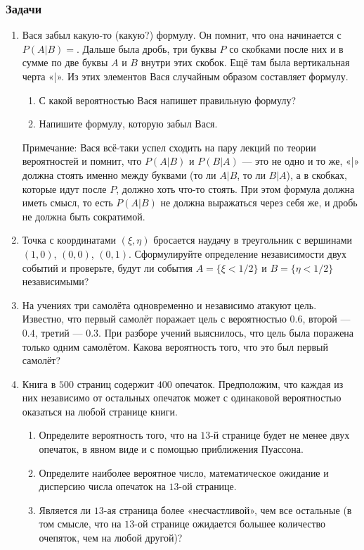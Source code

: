 \documentclass[12pt, a4paper]{article}\usepackage[]{graphicx}\usepackage[]{color}
\begin{document}
				\subsubsection*{Задачи}

				\begin{enumerate}



					\item Вася забыл какую-то (какую?) формулу. Он помнит, что она начинается с $P(A|B)=$. Дальше была дробь, три буквы $P$ со скобками после них и в сумме по две буквы $A$ и $B$ внутри этих скобок. Ещё там была вертикальная черта «|». Из этих элементов Вася случайным образом составляет формулу.
					\begin{enumerate}
						\item С какой вероятностью Вася напишет правильную формулу?
						\item Напишите формулу, которую забыл Вася.
					\end{enumerate}

					Примечание: Вася всё-таки успел сходить на пару лекций по теории вероятностей и помнит, что $P(A|B)$ и $P(B|A)$ — это не одно и то же, «|» должна стоять именно между буквами (то ли $A|B$, то ли $B|A$), а в скобках, которые идут после $P$, должно хоть что-то стоять. При этом формула должна иметь смысл, то есть  $P(A|B)$   не должна выражаться через себя же, и дробь не должна быть сократимой.

					\item Точка с координатами $(\xi, \eta)$ бросается наудачу в треугольник с вершинами $(1,0)$, $(0,0)$, $(0,1)$.  Сформулируйте определение независимости двух событий и проверьте, будут ли события $A=\{ \xi < 1/2 \}$  и $B=\{ \eta < 1/2 \}$  независимыми?

					\item На учениях три самолёта одновременно и независимо атакуют цель. Известно, что первый самолёт поражает цель с вероятностью $0.6$, второй — $0.4$, третий — $0.3$. При разборе учений выяснилось, что цель была поражена только одним самолётом. Какова вероятность того, что это был первый самолёт?

					\item Книга в $500$ страниц содержит $400$ опечаток. Предположим, что каждая из них независимо от остальных опечаток может с одинаковой вероятностью оказаться на любой странице книги.
					\begin{enumerate}

						\item Определите вероятность того, что на $13$-й странице будет не менее двух опечаток, в явном виде и с помощью приближения Пуассона.
						\item Определите наиболее вероятное число, математическое ожидание и дисперсию числа опечаток на $13$-ой странице.
						\item Является ли $13$-ая страница более «несчастливой», чем все остальные (в том смысле, что на $13$-ой странице ожидается большее количество очепяток, чем на любой другой)?
					\end{enumerate}


\end{enumerate}
\end{document}
